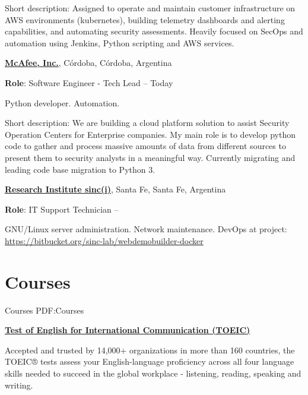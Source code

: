 \documentclass[letterpaper,MMMyyyy,nonstop]{simpleresumecv}
\begin{document}
\begin{body}
\BulletItem Short description: Assigned to operate and maintain customer infrastructure on AWS environments (kubernetes), building telemetry dashboards and alerting capabilities, and automating security assessments. Heavily focused on SecOps and automation using Jenkins, Python scripting and AWS services.


\GapNoBreak
\href{http://www.mcafee.com}
{\textbf{McAfee, Inc.}},
Córdoba, Córdoba, Argentina

\GapNoBreak
\BulletItem
\textbf{Role}: Software Engineer - Tech Lead
\hfill
{} --
Today
\begin{detail}
	\SubBulletItem
	Python developer.
	\SubBulletItem
	Automation.
\end{detail}

\BulletItem Short description: We are building a cloud platform solution to assist Security Operation Centers for Enterprise companies. My main role is to develop python code to gather and process massive amounts of data from different sources to present them to security analysts in a meaningful way. Currently migrating and leading code base migration to Python 3.

\GapNoBreak
\href{http://www.sinc.unl.edu.ar}
{\textbf{Research Institute sinc(i)}},
Santa Fe, Santa Fe, Argentina

\GapNoBreak
\BulletItem
\textbf{Role}: IT Support Technician
\hfill
{} --
\begin{detail}
\SubBulletItem
GNU/Linux server administration.
\SubBulletItem
Network maintenance.
\SubBulletItem
DevOps at project: \href{https://bitbucket.org/sinc-lab/webdemobuilder-docker}{https://bitbucket.org/sinc-lab/webdemobuilder-docker}
\end{detail}


\section
{Courses}
{Courses}
{PDF:Courses}


\href{https://www.ets.org/toeic}{\textbf{Test of English for International Communication (TOEIC)}}
\hfill
{}

\begin{detail}
	\SubBulletItem 
	Accepted and trusted by 14,000+ organizations in more than 160 countries, the TOEIC® tests assess your English-language proficiency across all four language skills needed to succeed in the global workplace - listening, reading, speaking and writing.
\end{detail}


\end{body}
\end{document}
